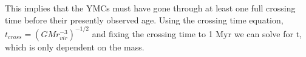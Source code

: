 This implies that the YMCs must have gone through at least one full crossing time before their presently observed age. Using the crossing time equation, $t_{cross}=(GMr_{vir}^{-3})^{-1/2}$ and fixing the crossing time to 1 Myr we can solve for t, which is only dependent on the mass.